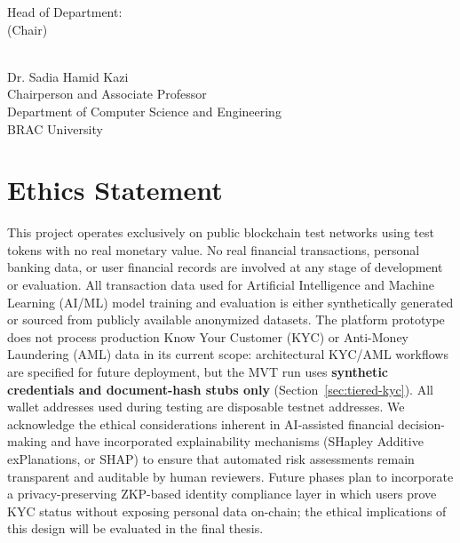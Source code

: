 \documentclass[12pt,a4paper]{report}
\begin{document}
\begin{flushleft}
Head of Department:\\
(Chair)
\end{flushleft}

\begin{flushright}
\vspace{-0.5cm}
\hrulefill\\
Dr. Sadia Hamid Kazi\\
Chairperson and Associate Professor\\
Department of Computer Science and Engineering\\
BRAC University
\end{flushright}

\newpage
\thispagestyle{empty}

\chapter*{Ethics Statement}
{}

This project operates exclusively on public blockchain test networks using test tokens with no real monetary value. No real financial transactions, personal banking data, or user financial records are involved at any stage of development or evaluation. All transaction data used for Artificial Intelligence and Machine Learning (AI/ML) model training and evaluation is either synthetically generated or sourced from publicly available anonymized datasets. The platform prototype does not process production Know Your Customer (KYC) or Anti-Money Laundering (AML) data in its current scope: architectural KYC/AML workflows are specified for future deployment, but the MVT run uses \textbf{synthetic credentials and document-hash stubs only} (Section~\ref{sec:tiered-kyc}). All wallet addresses used during testing are disposable testnet addresses. We acknowledge the ethical considerations inherent in AI-assisted financial decision-making and have incorporated explainability mechanisms (SHapley Additive exPlanations, or SHAP) to ensure that automated risk assessments remain transparent and auditable by human reviewers. Future phases plan to incorporate a privacy-preserving ZKP-based identity compliance layer in which users prove KYC status without exposing personal data on-chain; the ethical implications of this design will be evaluated in the final thesis.
\end{document}
